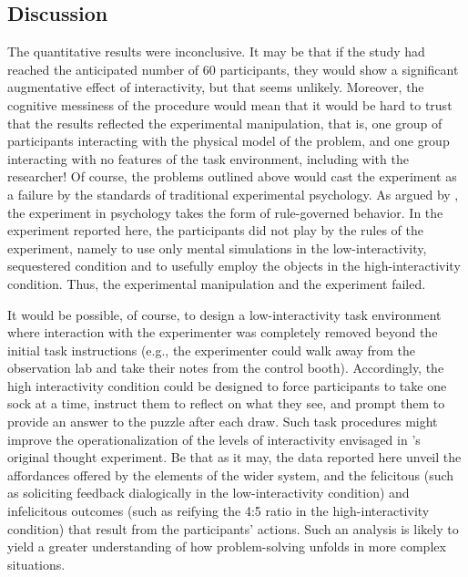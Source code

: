 \documentclass[twocolumn, serif, empirical, authordate]{jote-article}
\begin{document}
\subsection*{Discussion}

The quantitative results were inconclusive. It may be that if the study had reached the anticipated number of 60 participants, they would show a significant augmentative effect of interactivity, but that seems unlikely. Moreover, the cognitive messiness of the procedure would mean that it would be hard to trust that the results reflected the experimental manipulation, that is, one group of participants interacting with the physical model of the problem, and one group interacting with no features of the task environment, including with the researcher! Of course, the problems outlined above would cast the experiment as a failure by the standards of traditional experimental psychology. As argued by \textcite{Gozli2017}, the experiment in psychology takes the form of rule-governed behavior. In the experiment reported here, the participants did not play by the rules of the experiment, namely to use only mental simulations in the low-interactivity, sequestered condition and to usefully employ the objects in the high-interactivity condition. Thus, the experimental manipulation and the experiment failed. 

It would be possible, of course, to design a low-interactivity task environment where interaction with the experimenter was completely removed beyond the initial task instructions (e.g., the experimenter could walk away from the observation lab and take their notes from the control booth). Accordingly, the high interactivity condition could be designed to force participants to take one sock at a time, instruct them to reflect on what they see, and prompt them to provide an answer to the puzzle after each draw. Such task procedures might improve the operationalization of the levels of interactivity envisaged in \textcite{Vallee-Tourangeau2020}'s original thought experiment. Be that as it may, the data reported here unveil the affordances offered by the elements of the wider system, and the felicitous (such as soliciting feedback dialogically in the low-interactivity condition) and infelicitous outcomes (such as reifying the 4:5 ratio in the high-interactivity condition) that result from the participants' actions. Such an analysis is likely to yield a greater understanding of how problem-solving unfolds in more complex situations. 
\end{document}
